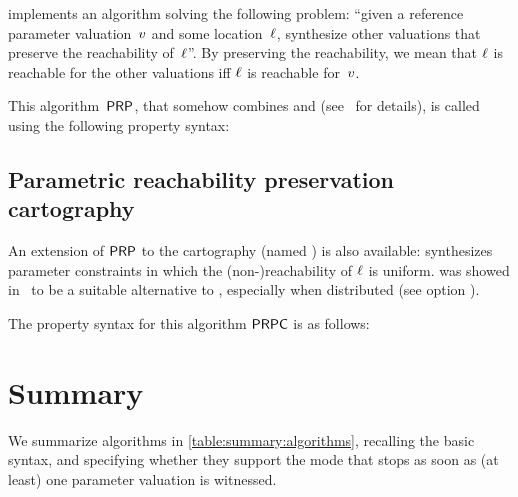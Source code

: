 \imitator{} implements an algorithm solving the following problem:
``given a reference parameter valuation~$v$ and some location~$\ell$, synthesize other valuations that preserve the reachability of~$\ell$''.
By preserving the reachability, we mean that $\ell$ is reachable for the other valuations iff $\ell$ is reachable for~$v$.

This algorithm~$\mathsf{PRP}$, that somehow combines \EFsynth{} and \IM{} (see~\cite{ALNS15} for details), is called using the following property syntax:




\subsection*{Parametric reachability preservation cartography}\label{sss:mode:PRPC}

An extension of $\mathsf{PRP}$ to the cartography (named \PRPC{}) is also available: \PRPC{} synthesizes parameter constraints in which the (non-)reachability of $\ell$ is uniform.
\PRPC{} was showed in~\cite{ALNS15} to be a suitable alternative to \EFsynth{}, especially when distributed (see option ).

The property syntax for this algorithm $\mathsf{PRPC}$ is as follows:




\section{Summary}\label{ss:mode:summary}

We summarize algorithms in \cref{table:summary:algorithms}, recalling the basic syntax, and specifying whether they support the  mode that stops as soon as (at least) one parameter valuation is witnessed.

